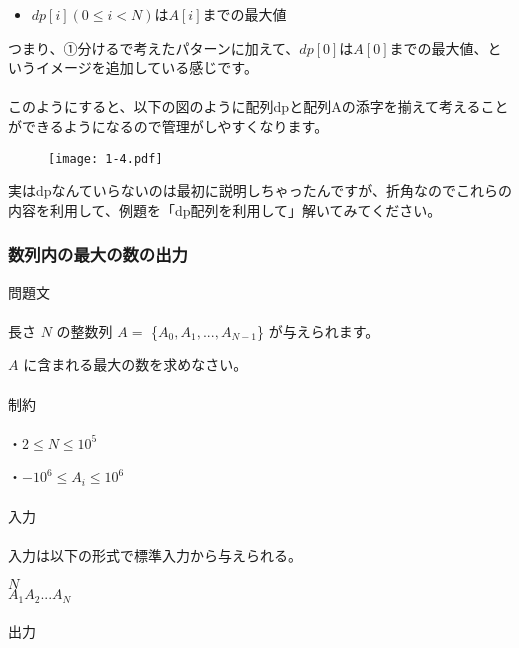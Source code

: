 \begin{itemize}
    \item $dp[i](0 \leq i < N)$は$A[i]$までの最大値
\end{itemize}

\noindent
つまり、①分けるで考えたパターンに加えて、$dp[0]$は$A[0]$までの最大値、というイメージを追加している感じです。
\\ \\ \noindent
このようにすると、以下の図のように配列dpと配列Aの添字を揃えて考えることができるようになるので管理がしやすくなります。

\begin{figure}[H]
    \centering
    \texttt{[image: 1-4.pdf]}
\end{figure}

\noindent
実はdpなんていらないのは最初に説明しちゃったんですが、折角なのでこれらの内容を利用して、例題を「dp配列を利用して」解いてみてください。

\clearpage

\subsubsection{数列内の最大の数の出力}
\noindent
{\LARGE 問題文}\\ \hrulefill \\

\noindent
長さ $N$ の整数列 $A=$ \{$A_0,A_1,...,A_{N-1}$\} が与えられます。

\noindent
$A$ に含まれる最大の数を求めなさい。
\\ \\
\noindent
{\LARGE 制約}\\ \hrulefill \\

\noindent
・$2 \leq N \leq 10^5$

\noindent
・$-10^6 \leq A_i \leq 10^6$
\\ \\
\noindent
{\LARGE 入力}\\ \hrulefill \\

\noindent
入力は以下の形式で標準入力から与えられる。 

\noindent
$N$ \\
$A_1 A_2 ... A_N$
\\ \\
\noindent
{\LARGE 出力}\\ \hrulefill \\

